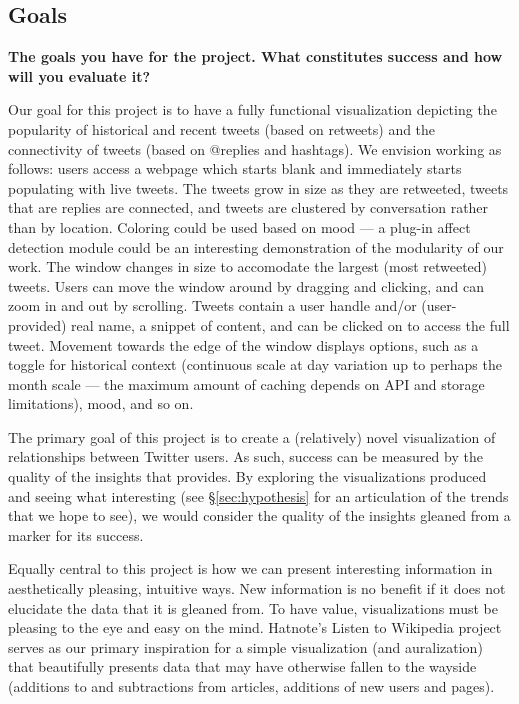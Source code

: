 \subsection{Goals}
\textbf{The goals you have for the project. What constitutes success and how will you evaluate it?}

Our goal for this project is to have a fully functional visualization depicting the popularity of historical and recent
tweets (based on retweets) and the connectivity of tweets (based on @replies and hashtags). 
We envision \sys working as follows: users access a webpage which starts blank and immediately starts populating with
live tweets. The tweets grow in size as they are retweeted, tweets that are replies are connected, and tweets are 
clustered by conversation rather than by location. Coloring could be used based on mood --- a plug-in affect detection
module could be an interesting demonstration of the modularity of our work. The window changes in size to accomodate the
largest (most retweeted) tweets. Users can move the window around by dragging and clicking, and can zoom in and out
by scrolling. Tweets contain a user handle and/or (user-provided) real name, a snippet of content, and can be clicked on
to access the full tweet. Movement towards the edge of the window displays options, such as a toggle for historical 
context (continuous scale at day variation up to perhaps the month scale --- the maximum amount of caching depends on 
API and storage limitations), mood, and so on.

The primary goal of this project is to create a (relatively) novel visualization of relationships between Twitter users.
As such, success can be measured by the quality of the insights that \sys provides. By exploring the visualizations 
produced and seeing what interesting (see \S \ref{sec:hypothesis} for an articulation of the trends that we hope to see),
we would consider the quality of the insights gleaned from \sys a marker for its success.

Equally central to this project is how we can present interesting information in aesthetically pleasing, intuitive ways.
New information is no benefit if it does not elucidate the data that it is gleaned from. To have value, visualizations
must be pleasing to the eye and easy on the mind. Hatnote's Listen to Wikipedia project~\cite{listenwiki} serves as our
primary inspiration for a simple visualization (and auralization) that beautifully presents data that may have otherwise
fallen to the wayside (additions to and subtractions from articles, additions of new users and pages). 

